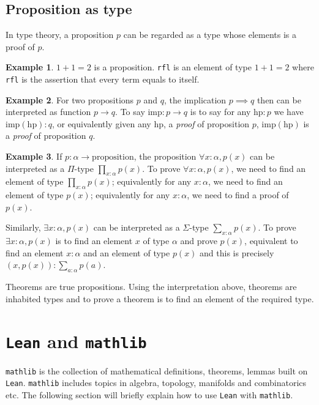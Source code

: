 \documentclass{report}
\theoremstyle{definition}
\newtheorem{example}{Example}
\begin{document}
\subsection{Proposition as type}
In type theory, a proposition $p$ can be regarded as a type whose elements is a proof of $p$.

\begin{example}
$1+1=2$ is a proposition. {\tt \small rfl} is an element of type $1+1=2$ where {\tt \small rfl} is the assertion that every term equals to itself.
\end{example}

\begin{example}
For two propositions $p$ and $q$, the implication $p\implies q$ then can be interpreted as function $p\to q$. To say $\mathrm{imp}: p\to q$ is to say for any $\mathrm{hp}:p$ we have $\mathrm{imp}( \mathrm{hp}): q$, or equivalently given any $\mathrm{hp}$, a {\it proof} of proposition $p$, $\mathrm{imp}(\mathrm{hp})$ is a {\it proof} of proposition $q$. 
\end{example}

\begin{example}
If $p:\alpha\to\mathrm{proposition}$, the proposition
$\forall x : \alpha, p(x)$ can be interpreted as a $\Pi$-type $\prod_{x:\alpha} p(x)$. To prove $\forall x: \alpha, p(x)$, we need to find an element of type $\prod_{x:\alpha} p(x)$; equivalently for any $x:\alpha$, we need to find an element of type $p(x)$; equivalently for any $x:\alpha$, we need to find a proof of $p (x)$.

Similarly, $\exists x:\alpha, p(x)$ can be interpreted as a $\Sigma$-type $\sum_{x:\alpha} p(x)$. To prove $\exists x:\alpha, p(x)$ is to find an element $x$ of type $\alpha$ and prove $p(x)$, equivalent to find an element $x:\alpha$ and an element of type $p(x)$ and this is precisely $(x, p(x)):\sum_{a:\alpha} p(a)$.
\end{example}

Theorems are true propositions. Using the interpretation above, theorems are inhabited types and to prove a theorem is to find an element of the required type.

\section{{\tt Lean} and {\tt mathlib}}
{\tt \small mathlib} is the collection of mathematical definitions, theorems, lemmas built on {\tt \small Lean}. {\tt \small mathlib} includes topics in algebra, topology, manifolds and combinatorics etc. The following section will briefly explain how to use {\tt \small Lean} with {\tt \small mathlib}.
\end{document}

